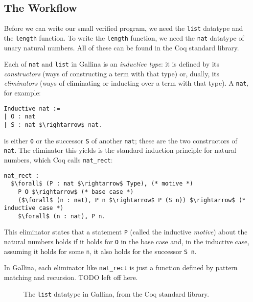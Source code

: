 \subsection{The Workflow}
\label{sec:mot-workflow}

Before we can write our small verified program,
we need the \lstinline{list} datatype and the \lstinline{length} function.
To write the \lstinline{length} function, we need the \lstinline{nat} datatype of unary natural numbers.
All of these can be found in the Coq standard library.

Each of \lstinline{nat} and \lstinline{list} in Gallina is an \textit{inductive type}:
it is defined by its \textit{constructors} (ways of constructing a term with that type)
or, dually, its \textit{eliminators} (ways of eliminating or inducting over a term with that type).
A \lstinline{nat}, for example:

\begin{lstlisting}
Inductive nat :=
| O : nat
| S : nat $\rightarrow$ nat.
\end{lstlisting}
is either \lstinline{0} or the successor \lstinline{S} of another \lstinline{nat};
these are the two constructors of \lstinline{nat}.
The eliminator this yields is the standard induction principle for natural numbers,
which Coq calls \lstinline{nat_rect}: %

\begin{lstlisting}
nat_rect :
  $\forall$ (P : nat $\rightarrow$ Type), (* motive *)
    P O $\rightarrow$ (* base case *)
    ($\forall$ (n : nat), P n $\rightarrow$ P (S n)) $\rightarrow$ (* inductive case *)
    $\forall$ (n : nat), P n.
\end{lstlisting}
This eliminator states that a statement \lstinline{P} (called the inductive \textit{motive}) about the natural numbers
holds if it holds for \lstinline{O} in the base case and, in the inductive case,
assuming it holds for some \lstinline{n}, it also holds for the successor \lstinline{S n}.

In Gallina, each eliminator like \lstinline{nat_rect} is just a function defined by
pattern matching and recursion.
TODO left off here.

\begin{figure}
   
\caption{The \lstinline{list} datatype in Gallina, from the Coq standard library.}
\label{fig:list}
\end{figure}

